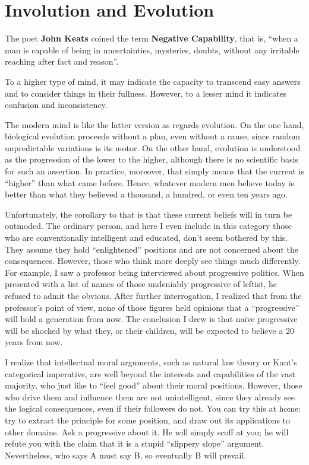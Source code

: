 \section{Involution and Evolution}

\label{sec:InvolutionEvolution}

The poet \textbf{John Keats} coined the term \textbf{Negative Capability}, that is, ``when a man is capable of being in uncertainties, mysteries, doubts, without any irritable reaching after fact and reason''.

To a higher type of mind, it may indicate the capacity to transcend easy answers and to consider things in their fullness. However, to a lesser mind it indicates confusion and inconsistency.

The modern mind is like the latter version as regards evolution. On the one hand, biological evolution proceeds without a plan, even without a cause, since random unpredictable variations is its motor. On the other hand, evolution is understood as the progression of the lower to the higher, although there is no scientific basis for such an assertion. In practice, moreover, that simply means that the current is ``higher'' than what came before. Hence, whatever modern men believe today is better than what they believed a thousand, a hundred, or even ten years ago.

Unfortunately, the corollary to that is that these current beliefs will in turn be outmoded. The ordinary person, and here I even include in this category those who are conventionally intelligent and educated, don't seem bothered by this. They assume they hold ``enlightened'' positions and are not concerned about the consequences. However, those who think more deeply see things much differently. For example, I saw a professor being interviewed about progressive politics. When presented with a list of names of those undeniably progressive of leftist, he refused to admit the obvious. After further interrogation, I realized that from the professor's point of view, none of those figures held opinions that a ``progressive'' will hold a generation from now. The conclusion I drew is that naïve progressive will be shocked by what they, or their children, will be expected to believe a 20 years from now.

I realize that intellectual moral arguments, such as natural law theory or Kant's categorical imperative, are well beyond the interests and capabilities of the vast majority, who just like to ``feel good'' about their moral positions. However, those who drive them and influence them are not unintelligent, since they already see the logical consequences, even if their followers do not. You can try this at home: try to extract the principle for some position, and draw out its applications to other domains. Ask a progressive about it. He will simply scoff at you; he will refute you with the claim that it is a stupid ``slippery slope'' argument. Nevertheless, who says A must say B, so eventually B will prevail.

